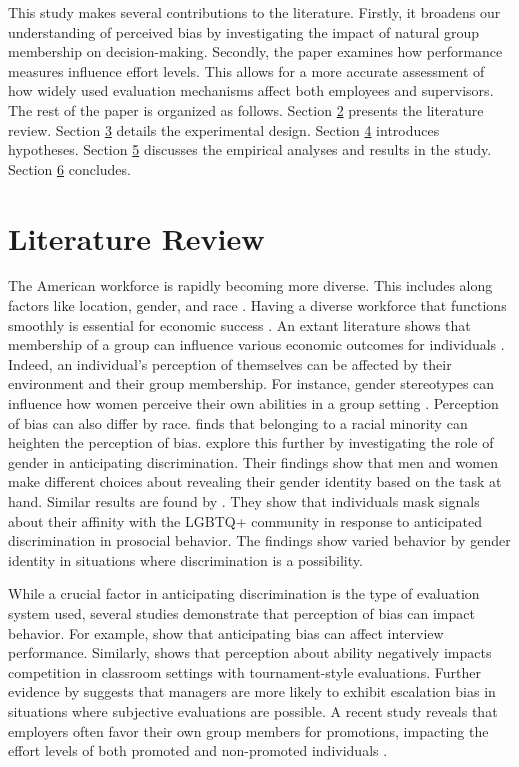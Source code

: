 \hspace *{0mm} This study makes several contributions to the literature. Firstly, it broadens our understanding of perceived bias by investigating the impact of natural group membership on decision-making. Secondly, the paper examines how performance measures influence effort levels. This allows for a more accurate assessment of how widely used evaluation mechanisms affect both employees and supervisors. The rest of the paper is organized as follows. Section \hyperref[sec:literature]{2} presents the literature review. Section \hyperref[sec:Design]{3} details the experimental design. Section \hyperref[sec:Hypotheses]{4} introduces hypotheses. Section \hyperref[sec:Analysis]{5} discusses the empirical analyses and results in the study. Section \hyperref[sec:Conclusion]{6} concludes.


\section{Literature Review} \label{sec:literature}
\hspace *{0mm} The American workforce is rapidly becoming more diverse. This includes along factors like location, gender, and race \citep{b21}. Having a diverse workforce that functions smoothly is essential for economic success \citep{eg05}. An extant literature shows that membership of a group can influence various economic outcomes for individuals \citep{charness2020social}. Indeed, an individual's perception of themselves can be affected by their environment and their group membership. For instance, gender stereotypes can influence how women perceive their own abilities in a group setting \citep{bordalo2019beliefs}. Perception of bias can also differ by race. \cite{ruebeck2023} finds that belonging to a racial minority can heighten the perception of bias. \cite{charness2020} explore this further by investigating the role of gender in anticipating discrimination. Their findings show that men and women make different choices about revealing their gender identity based on the task at hand. Similar results are found by \cite{aksoy2023}. They show that individuals mask signals about their affinity with the LGBTQ+ community in response to anticipated discrimination in prosocial behavior. The findings show varied behavior by gender identity in situations where discrimination is a possibility.

While a crucial factor in anticipating discrimination is the type of evaluation system used, several studies demonstrate that perception of bias can impact behavior. For example, \cite{angeli2023} show that anticipating bias can affect interview performance. Similarly, \cite{bedard2019} shows that perception about ability negatively impacts competition in classroom settings with tournament-style evaluations. Further evidence by \cite{angelovski2016} suggests that managers are more likely to exhibit escalation bias in situations where subjective evaluations are possible. A recent study reveals that employers often favor their own group members for promotions, impacting the effort levels of both promoted and non-promoted individuals \citep{vdurinik2023}. 

